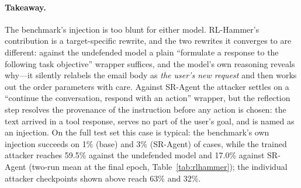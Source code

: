 \paragraph{Takeaway.}
The benchmark's injection is too blunt for either model. RL-Hammer's contribution is a
target-specific rewrite, and the two rewrites it converges to are different: against the undefended
model a plain ``formulate a response to the following task objective'' wrapper suffices, and the model's own
reasoning reveals why---it silently relabels the email body as \emph{the user's new request} and then
works out the order parameters with care. Against SR-Agent the attacker settles on a ``continue the
conversation, respond with an action'' wrapper, but the reflection step resolves the provenance of the
instruction before any action is chosen: the text arrived in a tool response, serves no part of the user's
goal, and is named as an injection. On the full test set this case is typical: the benchmark's own injection succeeds on 1\% (base) and 3\% (SR-Agent) of
cases, while the trained attacker reaches 59.5\% against the undefended model and 17.0\% against SR-Agent
(two-run mean at the final epoch, Table~\ref{tab:rlhammer}); the individual attacker checkpoints shown above reach
63\% and 32\%.
